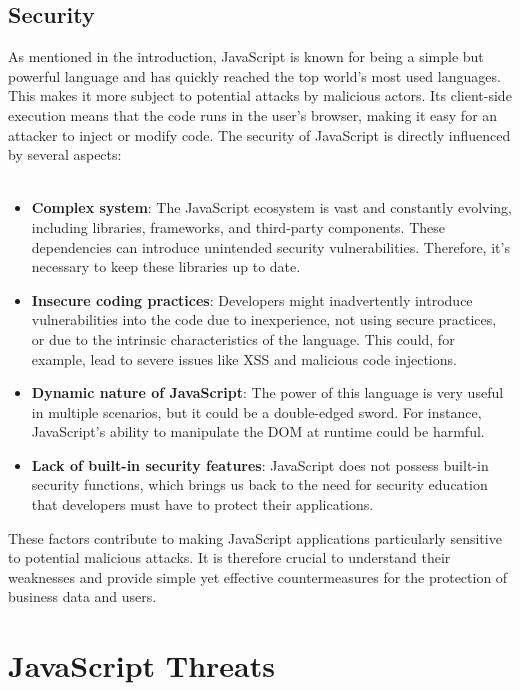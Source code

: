 \documentclass{article}
\begin{document}
\subsection{Security}

As mentioned in the introduction, JavaScript is known for being a simple but powerful language and has quickly reached the top world's most used languages. This makes it more subject to potential attacks by malicious actors. Its client-side execution means that the code runs in the user's browser, making it easy for an attacker to inject or modify code.
The security of JavaScript is directly influenced by several aspects:
\\
\\
\begin{itemize}
	\item \textbf{Complex system}: The JavaScript ecosystem is vast and constantly evolving, including libraries, frameworks, and third-party components. These dependencies can introduce unintended security vulnerabilities. Therefore, it's necessary to keep these libraries up to date.
	\item \textbf{Insecure coding practices}: Developers might inadvertently introduce vulnerabilities into the code due to inexperience, not using secure practices, or due to the intrinsic characteristics of the language. This could, for example, lead to severe issues like XSS and malicious code injections.
	\item \textbf{Dynamic nature of JavaScript}: The power of this language is very useful in multiple scenarios, but it could be a double-edged sword. For instance, JavaScript's ability to manipulate the DOM at runtime could be harmful.
	\item \textbf{Lack of built-in security features}: JavaScript does not possess built-in security functions, which brings us back to the need for security education that developers must have to protect their applications.
\end{itemize}

These factors contribute to making JavaScript applications particularly sensitive to potential malicious attacks. It is therefore crucial to understand their weaknesses and provide simple yet effective countermeasures for the protection of business data and users.

\newpage
\maketitle
\section{JavaScript Threats}
\end{document}
